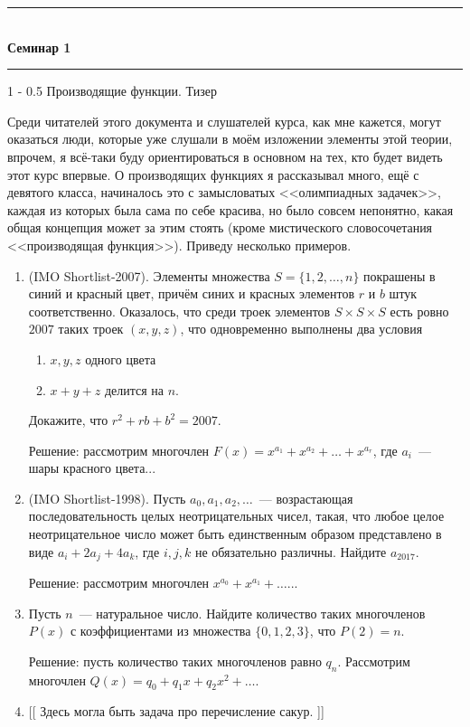 \documentclass[a5paper]{article}
\makeatletter
\def \topic {Семинар 1}
\theoremstyle{definition}
\renewcommand{\section}{\@startsection
{section}%
{1}%
{\z@}%
{-\baselineskip}%
{0.5\baselineskip}%
{\centering\large\scshape}} %
\makeatother
\begin{document}
\begin{center}

\newcommand{\HRule}{\rule{\linewidth}{0.5mm}}
\HRule \\[0.2cm]
{ \Large \bfseries \topic} %
\HRule

\end{center}

\section{Производящие функции. Тизер}

Среди читателей этого документа и слушателей курса, как мне кажется, могут 
оказаться люди, которые уже слушали в моём изложении элементы этой теории, 
впрочем, я всё-таки буду ориентироваться в основном на тех, кто будет видеть 
этот курс впервые.
О производящих функциях я рассказывал много, ещё с девятого класса, начиналось 
это с замысловатых <<олимпиадных задачек>>, каждая из которых была сама по себе 
красива, но было совсем непонятно, какая общая концепция может за этим стоять 
(кроме мистического словосочетания <<производящая функция>>). Приведу несколько 
примеров.

\begin{enumerate}
	\item (IMO Shortlist-2007). Элементы множества \( S = \{1,2,\ldots, n\} \) 
	покрашены в синий и красный цвет, причём синих и красных элементов \( r \) 
	и \( b \) штук соответственно. Оказалось, что среди троек элементов \( S 
	\times S \times S \) есть ровно \( 2007 \) таких троек \( (x,y,z) \), что 
	одновременно выполнены два условия
	\begin{enumerate}
		\item \( x,y, z \) одного цвета
		\item \( x  + y + z \) делится на \(  n \).
	\end{enumerate}
	Докажите, что \( r^2 + rb + b^2 = 2007 \).
	
	Решение: рассмотрим многочлен \( F(x) = x^{a_1} + x^{a_2} + \ldots + 
	x^{a_r} \), где \( a_i \)~--- шары красного цвета...
	\item (IMO Shortlist-1998). Пусть \( a_0, a_1, a_2, \ldots \)~--- 
	возрастающая последовательность 
	целых неотрицательных чисел, такая, что любое целое неотрицательное число 
	может быть единственным образом представлено в виде \( a_i + 2a_j + 4 a_k 
	\), где \( i,j,k \) не обязательно различны. Найдите \( a_{2017} \).
	
	Решение: рассмотрим многочлен \( x^{a_0} + x^{a_1} + \ldots \)...
	\item Пусть \( n \)~--- натуральное число. Найдите количество таких 
	многочленов \( P(x) \) с коэффициентами из множества \( \{0,1,2,3\} \), что 
	\( P(2) = n \).
	
	Решение: пусть количество таких многочленов равно  \( q_n \). Рассмотрим 
	многочлен \( Q(x) = q_0 + q_1 x + q_2 x^2 + \ldots \).
	\item {}[[ Здесь могла быть задача про перечисление сакур. ]]
\end{enumerate}
\end{document}
